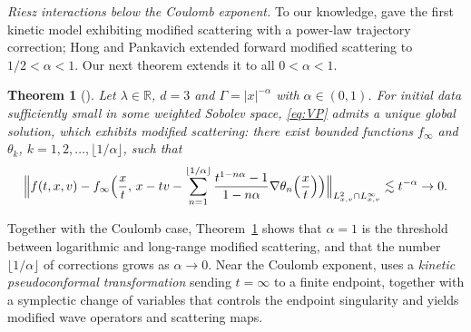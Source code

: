 \documentclass[10pt,reqno]{amsart}
\newtheorem{theorem}{Theorem}
\theoremstyle{definition}
\def\R{\mathbb{R}}
\begin{document}
\noindent\emph{Riesz interactions below the Coulomb exponent.} To our knowledge, \cite{HK24} gave the first kinetic model exhibiting modified scattering with a power-law trajectory correction; Hong and Pankavich \cite{HP26} extended forward modified scattering to $1/2<\alpha<1$. Our next theorem extends it to all $0<\alpha<1$.
\begin{theorem}[\cite{HK24,HX26b}]\label{thm:VR}
Let $\lambda\in\R$, $d=3$ and $\Gamma=|x|^{-\alpha}$ with $\alpha\in(0,1)$. For initial data sufficiently small in some weighted Sobolev space, \eqref{eq:VP} admits a unique global solution, which exhibits modified scattering: there exist bounded functions $f_\infty$ and $\theta_k$, $k=1,2,\dots,\lfloor1/\alpha\rfloor$, such that
\begin{equation}\label{eq:long-range-scatter}
\Bigl\|f(t,x,v)-f_\infty\Bigl(\frac{x}{t},\,x-tv-\sum_{n=1}^{\lfloor1/\alpha\rfloor}\frac{t^{1-n\alpha}-1}{1-n\alpha}\nabla\theta_n\Bigl(\frac{x}{t}\Bigr)\Bigr)\Bigr\|_{L^2_{x,v}\cap L^\infty_{x,v}}\lesssim t^{-\alpha}\to0.
\end{equation}
\end{theorem}
Together with the Coulomb case, Theorem~\ref{thm:VR} shows that $\alpha=1$ is the threshold between logarithmic and long-range modified scattering, and that the number $\lfloor1/\alpha\rfloor$ of corrections grows as $\alpha\to0$. Near the Coulomb exponent, \cite{HK24} uses a \emph{kinetic pseudoconformal transformation} sending $t=\infty$ to a finite endpoint, together with a symplectic change of variables that controls the endpoint singularity and yields modified wave operators and scattering maps.
 
\smallskip
 
\end{document}
